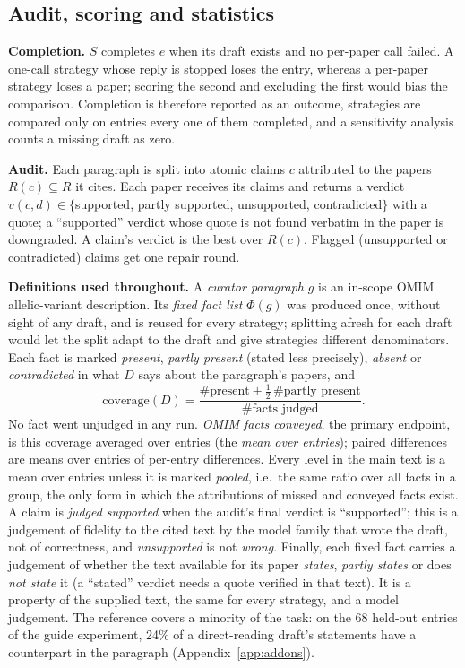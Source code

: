 \documentclass{article} %
\begin{document}
\subsection{Audit, scoring and statistics}
\label{sec:scoring}
\textbf{Completion.} $S$ completes $e$ when its draft exists and no per-paper call failed. A one-call strategy whose reply is stopped loses the entry, whereas a per-paper strategy loses a paper; scoring the second and excluding the first would bias the comparison. Completion is therefore reported as an outcome, strategies are compared only on entries every one of them completed, and a sensitivity analysis counts a missing draft as zero.

\textbf{Audit.} Each paragraph is split into atomic claims $c$ attributed to the papers $R(c)\subseteq R$ it cites. Each paper receives its claims and returns a verdict $v(c,d)\in\{$supported, partly supported, unsupported, contradicted$\}$ with a quote; a ``supported'' verdict whose quote is not found verbatim in the paper is downgraded. A claim's verdict is the best over $R(c)$. Flagged (unsupported or contradicted) claims get one repair round.

\textbf{Definitions used throughout.} A \emph{curator paragraph} $g$ is an in-scope OMIM allelic-variant description. Its \emph{fixed fact list} $\Phi(g)$ was produced once, without sight of any draft, and is reused for every strategy; splitting afresh for each draft would let the split adapt to the draft and give strategies different denominators. Each fact is marked \emph{present}, \emph{partly present} (stated less precisely), \emph{absent} or \emph{contradicted} in what $D$ says about the paragraph's papers, and
\begin{equation}
\text{coverage}(D)=\frac{\#\text{present}+\tfrac12\,\#\text{partly present}}{\#\text{facts judged}} .
\end{equation}
No fact went unjudged in any run. \emph{OMIM facts conveyed}, the primary endpoint, is this coverage averaged over entries (the \emph{mean over entries}); paired differences are means over entries of per-entry differences. Every level in the main text is a mean over entries unless it is marked \emph{pooled}, i.e.\ the same ratio over all facts in a group, the only form in which the attributions of missed and conveyed facts exist. A claim is \emph{judged supported} when the audit's final verdict is ``supported''; this is a judgement of fidelity to the cited text by the model family that wrote the draft, not of correctness, and \emph{unsupported} is not \emph{wrong}. Finally, each fixed fact carries a judgement of whether the text available for its paper \emph{states}, \emph{partly states} or does \emph{not state} it (a ``stated'' verdict needs a quote verified in that text). It is a property of the supplied text, the same for every strategy, and a model judgement. The reference covers a minority of the task: on the 68 held-out entries of the guide experiment, 24\% of a direct-reading draft's statements have a counterpart in the paragraph (Appendix~\ref{app:addons}).
\end{document}

